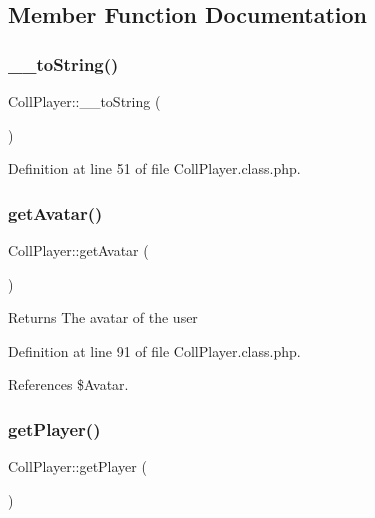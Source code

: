 \subsection{Member Function Documentation}
\mbox{\label{class_coll_player_ad8be65fd47e5e2f32b0d6b4834bbb8d4}} 
\subsubsection{\texorpdfstring{\+\_\+\+\_\+to\+String()}{\_\_toString()}}
{\footnotesize\ttfamily Coll\+Player\+::\+\_\+\+\_\+to\+String (\begin{DoxyParamCaption}{ }\end{DoxyParamCaption})}



Definition at line 51 of file Coll\+Player.\+class.\+php.

\mbox{\label{class_coll_player_a637eb922e5ca9cc7910627b889291323}} 
\subsubsection{\texorpdfstring{get\+Avatar()}{getAvatar()}}
{\footnotesize\ttfamily Coll\+Player\+::get\+Avatar (\begin{DoxyParamCaption}{ }\end{DoxyParamCaption})}

\begin{DoxyReturn}{Returns}
The avatar of the user 
\end{DoxyReturn}


Definition at line 91 of file Coll\+Player.\+class.\+php.



References \$\+Avatar.

\mbox{\label{class_coll_player_a6c05afc4eee3d39d1470147e13996bf5}} 
\subsubsection{\texorpdfstring{get\+Player()}{getPlayer()}}
{\footnotesize\ttfamily Coll\+Player\+::get\+Player (\begin{DoxyParamCaption}{ }\end{DoxyParamCaption})}


